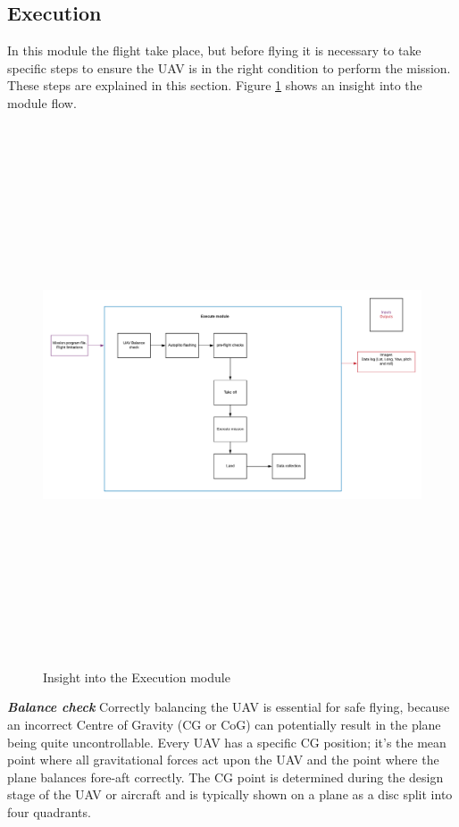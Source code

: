 \subsection{Execution}
In this module the flight take place, but before flying it is necessary to take specific steps to ensure the UAV is in the right condition to perform the mission. These steps are explained in this section.  Figure \ref{fig:execute} shows an insight into the module flow.
\begin{figure}[H]
\centering
\includegraphics[width=16cm,height=16cm,keepaspectratio]{imagenes/Execution.png}
\caption{Insight into the Execution module}
\label{fig:execute}
\end{figure}
\textit{\textbf{Balance check}} \newline
Correctly balancing the UAV is essential for safe flying, because an incorrect Centre of Gravity (CG or CoG) can potentially result in the plane being quite uncontrollable. Every UAV has a specific CG position; it's the mean point where all gravitational forces act upon the UAV and the point where the plane balances fore-aft correctly. The CG point is determined during the design stage of the UAV or aircraft and is typically shown on a plane as a disc split into four quadrants.

